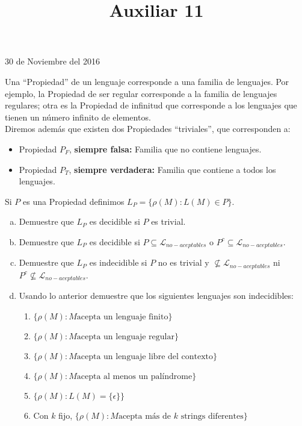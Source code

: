 \documentclass[dcc]{fcfmcourse}
\title{Auxiliar 11}
\begin{document}
\maketitle
\begin{center}
30 de Noviembre del 2016
\end{center}
\vspace{-1ex}
\begin{problems}
 \problem Una ``Propiedad'' de un lenguaje corresponde a una familia de lenguajes. Por ejemplo, la Propiedad de ser regular corresponde a la familia de lenguajes regulares; otra es la Propiedad de infinitud que corresponde a los lenguajes que tienen un número infinito de elementos.\\
  Diremos además que existen dos Propiedades ``triviales'', que corresponden a:
 \begin{itemize}
     \item Propiedad $P_{F}$, \textbf{siempre falsa:} Familia que no contiene lenguajes.
     \item Propiedad $P_{T}$, \textbf{siempre verdadera:} Familia que contiene a todos los lenguajes.
 \end{itemize}
 Si $P$ es una Propiedad definimos $L_{P} = \{\rho (M)\colon L(M) \in P\}$.
 \begin{enumerate}[a)]
     \item Demuestre que $L_{P}$ es decidible si $P$ es trivial.
     \item Demuestre que $L_{P}$ es decidible si $P \subseteq \mathcal{L}_{no-aceptables}$ o $P^c \subseteq \mathcal{L}_{no-aceptables}$.
     \item Demuestre que $L_{P}$ es indecidible si $P$ no es trivial y $\not\subseteq \mathcal{L}_{no-aceptables}$ ni $P^c\not\subseteq \mathcal{L}_{no-aceptables}$.
     \item Usando lo anterior demuestre que los siguientes lenguajes son indecidibles:
     \begin{enumerate}[1.]
         \item $\{\rho (M) \colon M \text{acepta un lenguaje finito}\}$
         \item $\{\rho (M) \colon M \text{acepta un lenguaje regular}\}$
         \item $\{\rho (M) \colon M \text{acepta un lenguaje libre del contexto}\}$
         \item $\{\rho (M) \colon M \text{acepta al menos un palíndrome}\}$
         \item $\{\rho (M) \colon L(M) = \{\epsilon\}\}$
         \item Con $k$ fijo, $\{\rho (M) \colon M \text{acepta más de $k$ strings diferentes}\}$

\end{enumerate}
\end{enumerate}
\end{problems}
\end{document}
